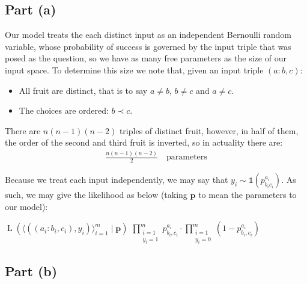 \subsection{Part (a)}

Our model treats the each distinct input as an independent Bernoulli random variable, whose probability of success is governed by the input triple that was posed as the question, so we have as many free parameters as the size of our input space. To determine this size we note that, given an input triple $(a : b, c)$:
\begin{itemize}[-]
\itemsep0em
\item All fruit are distinct, that is to say $a\neq b$, $b\neq c$ and $a\neq c$.
\item The choices are ordered: $b\prec c$.
\end{itemize}

There are $n(n-1)(n-2)$ triples of distinct fruit, however, in half of them, the order of the second and third fruit is inverted, so in actuality there are:
\begin{align*}
  \frac{n(n-1)(n-2)}{2}\quad\text{parameters}
\end{align*}

Because we treat each input independently, we may say that ${y_i\sim\mathbb{1}(p_{b_ic_i}^{a_i})}$. As such, we may give the likelihood as below (taking $\mathbf{p}$ to mean the parameters to our model):

\begin{itemize}
  \step $\operatorname{L}(\langle((a_i : b_i,c_i),y_i)\rangle_{i=1}^m\mid\mathbf{p})$
  \step[=] $\displaystyle\prod\limits_{\substack{i=1\\y_i=1}}^mp_{b_i,c_i}^{a_i}\cdot\prod_{\substack{i=1\\y_i=0}}^m(1 - p_{b_i,c_i}^{a_i})$
\end{itemize}

\subsection{Part (b)}

